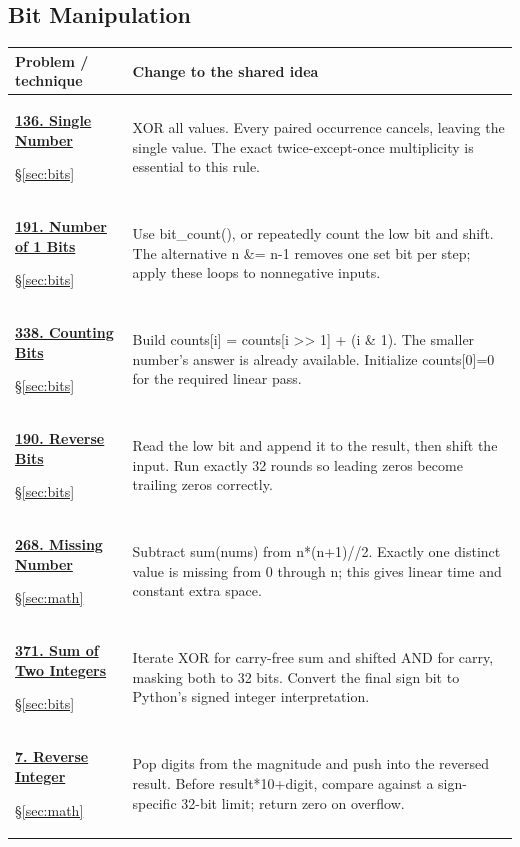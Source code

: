 \documentclass[11pt]{article}
\newcommand{\sect}[1]{\hyperref[sec:#1]{\S\ref*{sec:#1}}}
\begin{document}
\subsection{Bit Manipulation}
\begin{longtable}{@{}L{4.3cm}L{11.7cm}@{}}
\toprule Problem / technique & Change to the shared idea \\ \midrule\endhead
\hypertarget{lc136}{}\href{https://leetcode.com/problems/single-number/}{\textbf{136. Single Number}}\par\sect{bits} & XOR all values. Every paired occurrence cancels, leaving the single value. The exact twice-except-once multiplicity is essential to this rule.\\[4pt]
\hypertarget{lc191}{}\href{https://leetcode.com/problems/number-of-1-bits/}{\textbf{191. Number of 1 Bits}}\par\sect{bits} & Use bit\_count(), or repeatedly count the low bit and shift. The alternative n \&= n-1 removes one set bit per step; apply these loops to nonnegative inputs.\\[4pt]
\hypertarget{lc338}{}\href{https://leetcode.com/problems/counting-bits/}{\textbf{338. Counting Bits}}\par\sect{bits} & Build counts[i] = counts[i >> 1] + (i \& 1). The smaller number's answer is already available. Initialize counts[0]=0 for the required linear pass.\\[4pt]
\hypertarget{lc190}{}\href{https://leetcode.com/problems/reverse-bits/}{\textbf{190. Reverse Bits}}\par\sect{bits} & Read the low bit and append it to the result, then shift the input. Run exactly 32 rounds so leading zeros become trailing zeros correctly.\\[4pt]
\hypertarget{lc268}{}\href{https://leetcode.com/problems/missing-number/}{\textbf{268. Missing Number}}\par\sect{math} & Subtract sum(nums) from n*(n+1)//2. Exactly one distinct value is missing from 0 through n; this gives linear time and constant extra space.\\[4pt]
\hypertarget{lc371}{}\href{https://leetcode.com/problems/sum-of-two-integers/}{\textbf{371. Sum of Two Integers}}\par\sect{bits} & Iterate XOR for carry-free sum and shifted AND for carry, masking both to 32 bits. Convert the final sign bit to Python's signed integer interpretation.\\[4pt]
\hypertarget{lc7}{}\href{https://leetcode.com/problems/reverse-integer/}{\textbf{7. Reverse Integer}}\par\sect{math} & Pop digits from the magnitude and push into the reversed result. Before result*10+digit, compare against a sign-specific 32-bit limit; return zero on overflow.\\[4pt]
\bottomrule
\end{longtable}
\end{document}
